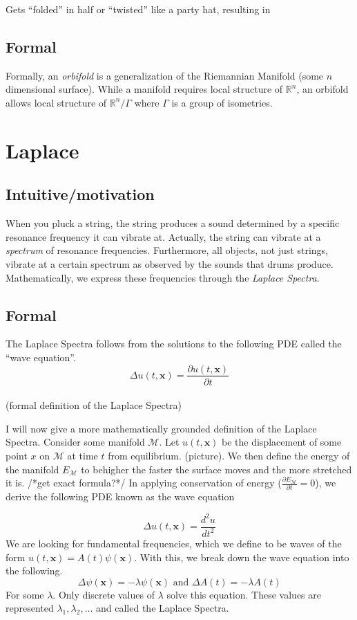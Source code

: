 \documentclass{article}
\newcommand{\pder}[2]{\frac{\partial#1}{\partial#2}}
\begin{document}
Gets ``folded'' in half or ``twisted'' like a party hat, resulting in 



\subsection{Formal}

Formally, an \emph{orbifold} is a generalization of the Riemannian
Manifold (some $n$ dimensional surface). While a manifold requires local
structure of $\mathbb{R}^n$, an orbifold allows local structure of
$\mathbb{R}^n/\Gamma$ where $\Gamma$ is a group of isometries.

\section{Laplace}
\subsection{Intuitive/motivation}
When you pluck a string, the string produces a sound determined by a
specific resonance frequency it can vibrate at. Actually, the string can
vibrate at a \emph{spectrum} of resonance frequencies. Furthermore, all
objects, not just strings, vibrate at a certain spectrum as observed by the
sounds that drums produce. Mathematically, we express these frequencies
through the \emph{Laplace Spectra}.

\subsection{Formal}
The Laplace Spectra follows from the solutions to the following PDE called
the ``wave equation''.
$$ \Delta u(t,\mathbf{x}) = \pder{u(t,\mathbf{x})}{t} $$
\\
(formal definition of the Laplace Spectra)

I will now give a more mathematically grounded definition of the Laplace
Spectra. Consider some manifold $\mathcal{M}$. Let $u(t,\mathbf{x})$ be the
displacement of some point $x$ on $\mathcal{M}$ at time $t$ from
equilibrium. (picture). We then define the energy of the manifold
$E_{\mathcal{M}}$ to behigher the faster the surface moves and the more
stretched it is. /*get exact formula?*/ In applying conservation of energy
($\pder{E_{\mathcal{M}}}{t} =0$), we derive the following PDE known as the
wave equation

\begin{equation}\label{eq:test}
    \Delta u(t,\mathbf{x}) = \frac{d^2 u}{dt^2}
\end{equation}
We are looking for fundamental frequencies, which we define to be waves of the form $u(t,\mathbf{x}) = A(t)\psi(\mathbf{x})$. With this, we break down the wave equation into the following.
\begin{equation}
    \Delta \psi(\mathbf{x}) = -\lambda \psi(\mathbf{x})
    \text{ and }
    \Delta A(t) = -\lambda A(t)
\end{equation}
For some $\lambda$. Only discrete values of $\lambda$ solve this equation. These values are represented $\lambda_1, \lambda_2, \dots$ and called the Laplace Spectra.
\end{document}
